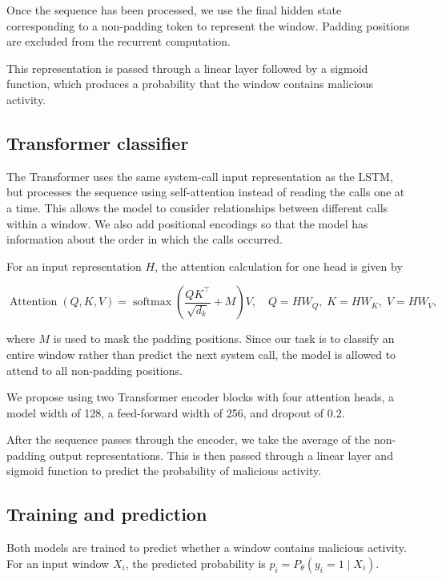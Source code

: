 \documentclass{article}
\begin{document}
Once the sequence has been processed, we use the final
hidden state corresponding to a non-padding token to
represent the window. Padding positions are excluded
from the recurrent computation.

This representation is passed through a linear layer
followed by a sigmoid function, which produces a
probability that the window contains malicious activity.

\subsection{Transformer classifier}
\label{model:transformer}

The Transformer uses the same system-call input
representation as the LSTM, but processes the sequence
using self-attention instead of reading the calls one
at a time. This allows the model to consider relationships
between different calls within a window. We also add
positional encodings so that the model has information
about the order in which the calls occurred.

For an input representation $H$, the attention calculation
for one head is given by

\begin{equation}
\operatorname{Attention}(Q,K,V)
=\operatorname{softmax}\!\left(
\frac{QK^\top}{\sqrt{d_k}}+M
\right)V,
\quad
Q=HW_Q,\;K=HW_K,\;V=HW_V,
\end{equation}

where $M$ is used to mask the padding positions.
Since our task is to classify an entire window rather
than predict the next system call, the model is allowed
to attend to all non-padding positions.

We propose using two Transformer encoder blocks with
four attention heads, a model width of 128, a feed-forward
width of 256, and dropout of $0.2$.

After the sequence passes through the encoder, we take
the average of the non-padding output representations.
This is then passed through a linear layer and sigmoid
function to predict the probability of malicious activity.

\subsection{Training and prediction}
\label{model:training}

Both models are trained to predict whether a window
contains malicious activity. For an input window $X_i$,
the predicted probability is
$\hat p_i=P_\theta(y_i=1\mid X_i)$.
\end{document}
